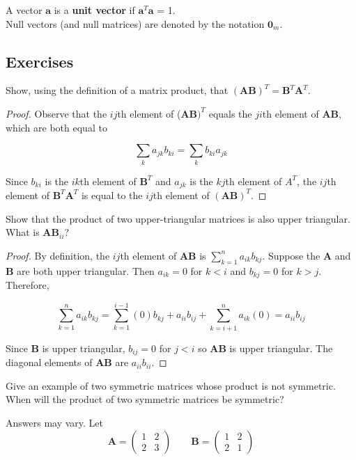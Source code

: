 \documentclass[11pt]{article}
\theoremstyle{definition}
\begin{document}
A vector $\mathbf{a}$ is a \textbf{unit vector} if $\mathbf{a}^T\mathbf{a}$ = 1.\\

Null vectors (and null matrices) are denoted by the notation $\mathbf{0}_m$.

\subsection{Exercises}
\begin{enumerate}
\item Show, using the definition of a matrix product, that $(\mathbf{AB})^T = \mathbf{B}^T\mathbf{A}^T$.

\begin{proof}
Observe that the $ij$th element of ($\mathbf{AB})^T$ equals the $ji$th element of $\mathbf{AB}$, which are both equal to 

$$ \sum_k a_{jk}b_{ki} = \sum_k b_{ki} a_{jk}$$

Since $b_{ki}$ is the $ik$th element of $\mathbf{B}^T$ and $a_{jk}$ is the $kj$th element of $A^T$, the $ij$th element of $\mathbf{B}^T\mathbf{A}^T$ is equal to the $ij$th element of $\mathbf{(AB)}^T$.
\end{proof}

\item Show that the product of two upper-triangular matrices is also upper triangular.  What is $\mathbf{AB}_{ii}$?

\begin{proof}
\item By definition, the $ij$th element of $\mathbf{AB}$ is $\sum_{k=1}^n a_{ik} b_{kj}$.  Suppose the $\mathbf{A}$ and $\mathbf{B}$ are both upper triangular.  Then $a_{ik} = 0$ for $k < i$ and $b_{kj} = 0$ for $k > j$.  Therefore,

$$\sum_{k = 1}^n a_{ik}b_{kj} = \sum_{k = 1}^{i-1} (0)b_{kj} + a_{ii}b_{ij} + \sum_{k = i+1}^n a_{ik}(0) = a_{ii}b_{ij}$$

Since $\mathbf{B}$ is upper triangular, $b_{ij} = 0$ for $j < i$ so $\mathbf{AB}$ is upper triangular.  The diagonal elements of $\mathbf{AB}$ are $a_{ii}b_{ii}$.


\end{proof}
\item Give an example of two symmetric matrices whose product is not symmetric.  When will the product of two symmetric matrices be symmetric? 

Answers may vary.  Let $$\mathbf{A} = \begin{pmatrix} 1 & 2 \\ 2 & 3\end{pmatrix} \qquad \mathbf{B} = \begin{pmatrix} 1 & 2 \\ 2 & 1 \end{pmatrix}$$


\end{enumerate}
\end{document}

